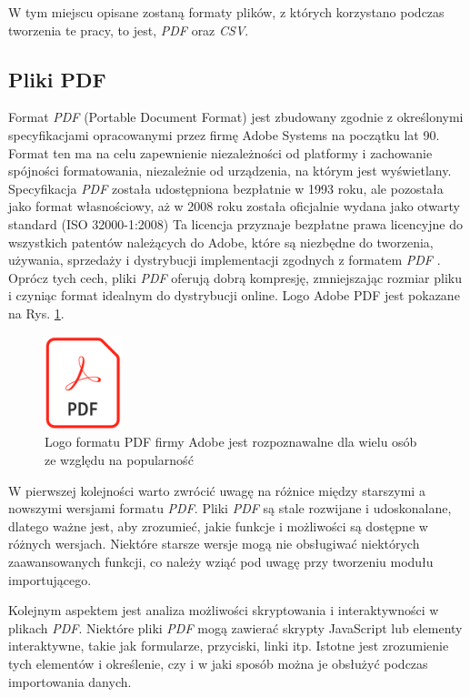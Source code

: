 \documentclass[a4paper,twoside,12pt]{book}
\begin{document}
W tym miejscu opisane zostaną formaty plików, z których korzystano podczas tworzenia te pracy, to jest, \emph{PDF} oraz \emph{CSV}. 

\subsection{Pliki PDF}

Format \emph{PDF} (Portable Document Format) jest zbudowany zgodnie z określonymi specyfikacjami opracowanymi przez firmę Adobe Systems na początku lat 90. Format ten ma na celu zapewnienie niezależności od platformy i zachowanie spójności formatowania, niezależnie od urządzenia, na którym jest wyświetlany\cite{bib:pdf_ref}. Specyfikacja \emph{PDF} została udostępniona bezpłatnie w 1993 roku, ale pozostała jako format własnościowy, aż w 2008 roku została oficjalnie wydana jako otwarty standard (ISO 32000-1:2008)\cite{bib:iso} Ta licencja przyznaje bezpłatne prawa licencyjne do wszystkich patentów należących do Adobe, które są niezbędne do tworzenia, używania, sprzedaży i dystrybucji implementacji zgodnych z formatem \emph{PDF} \cite{bib:adobe_cert}. Oprócz tych cech, pliki \emph{PDF} oferują dobrą kompresję, zmniejszając rozmiar pliku i czyniąc format idealnym do dystrybucji online. Logo Adobe PDF jest pokazane na Rys. \ref{fig:pdf_logo}.

\begin{figure}
\centering
\includegraphics[width=0.2\textwidth]{./images/PDF_logo.png}
\caption{Logo formatu PDF firmy Adobe jest rozpoznawalne dla wielu osób ze względu na popularność 
\cite{bib:pdf_logo}}
\label{fig:pdf_logo}
\end{figure}

W pierwszej kolejności warto zwrócić uwagę na różnice między starszymi a nowszymi wersjami formatu \emph{PDF}. Pliki \emph{PDF} są stale rozwijane i udoskonalane, dlatego ważne jest, aby zrozumieć, jakie funkcje i możliwości są dostępne w różnych wersjach. Niektóre starsze wersje mogą nie obsługiwać niektórych zaawansowanych funkcji, co należy wziąć pod uwagę przy tworzeniu modułu importującego.

Kolejnym aspektem jest analiza możliwości skryptowania i interaktywności w plikach \emph{PDF}. Niektóre pliki \emph{PDF} mogą zawierać skrypty JavaScript lub elementy interaktywne, takie jak formularze, przyciski, linki itp. Istotne jest zrozumienie tych elementów i określenie, czy i w jaki sposób można je obsłużyć podczas importowania danych.
\end{document}
